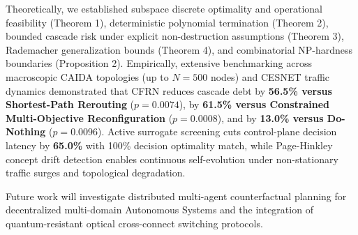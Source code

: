 \documentclass[pdflatex,sn-mathphys-num]{sn-jnl}
\theoremstyle{thmstyleone}
\theoremstyle{thmstyletwo}
\theoremstyle{thmstylethree}
\begin{document}
Theoretically, we established subspace discrete optimality and operational feasibility (Theorem 1), deterministic polynomial termination (Theorem 2), bounded cascade risk under explicit non-destruction assumptions (Theorem 3), Rademacher generalization bounds (Theorem 4), and combinatorial NP-hardness boundaries (Proposition 2). Empirically, extensive benchmarking across macroscopic CAIDA topologies (up to $N=500$ nodes) and CESNET traffic dynamics demonstrated that CFRN reduces cascade debt by \textbf{56.5\% versus Shortest-Path Rerouting} ($p = 0.0074$), by \textbf{61.5\% versus Constrained Multi-Objective Reconfiguration} ($p = 0.0008$), and by \textbf{13.0\% versus Do-Nothing} ($p = 0.0096$). Active surrogate screening cuts control-plane decision latency by \textbf{65.0\%} with 100\% decision optimality match, while Page-Hinkley concept drift detection enables continuous self-evolution under non-stationary traffic surges and topological degradation.

Future work will investigate distributed multi-agent counterfactual planning for decentralized multi-domain Autonomous Systems and the integration of quantum-resistant optical cross-connect switching protocols.


\end{document}
